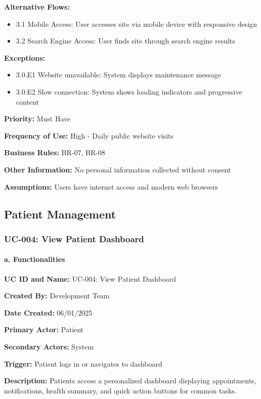 \documentclass[12pt,a4paper]{article}
\begin{document}
\textbf{Alternative Flows:}
\begin{itemize}
\item 3.1 Mobile Access: User accesses site via mobile device with responsive design
\item 3.2 Search Engine Access: User finds site through search engine results
\end{itemize}

\textbf{Exceptions:}
\begin{itemize}
\item 3.0.E1 Website unavailable: System displays maintenance message
\item 3.0.E2 Slow connection: System shows loading indicators and progressive content
\end{itemize}

\textbf{Priority:} Must Have

\textbf{Frequency of Use:} High - Daily public website visits

\textbf{Business Rules:} BR-07, BR-08

\textbf{Other Information:} No personal information collected without consent

\textbf{Assumptions:} Users have internet access and modern web browsers

\subsection{Patient Management}

\subsubsection{UC-004: View Patient Dashboard}

\paragraph{a. Functionalities}

\textbf{UC ID and Name:} UC-004: View Patient Dashboard

\textbf{Created By:} Development Team

\textbf{Date Created:} 06/01/2025

\textbf{Primary Actor:} Patient

\textbf{Secondary Actors:} System

\textbf{Trigger:} Patient logs in or navigates to dashboard

\textbf{Description:} Patients access a personalized dashboard displaying appointments, notifications, health summary, and quick action buttons for common tasks.
\end{document}
